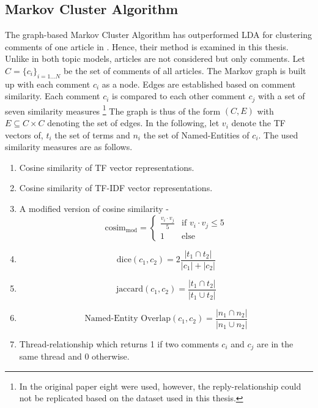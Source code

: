 \subsection{Markov Cluster Algorithm}
The graph-based Markov Cluster Algorithm has outperformed LDA for clustering comments of one article in \cite{DBLP:conf/ecir/AkerKBPBHG16}. Hence, their method is examined in this thesis. Unlike in both topic models, articles are not considered but only comments. Let $C = \{c_i\}_{i=1...N}$ be the set of comments of all articles. The Markov graph is built up with each comment $c_i$ as a node. Edges are established based on comment similarity. Each comment $c_i$ is compared to each other comment $c_j$ with a set of seven similarity measures \footnote{In the original paper \cite{DBLP:conf/ecir/AkerKBPBHG16} eight were used, however, the reply-relationship could not be replicated based on the dataset used in this thesis.} The graph is thus of the form $(C,E)$ with $E \subseteq C \times C$ denoting the set of edges.
In the following, let $v_i$ denote the TF vectors of, $t_i$ the set of terms and $n_i$ the set of Named-Entities of $c_i$. The used similarity measures are as follows.
\begin{enumerate}
\item Cosine similarity of TF vector representations.
\item Cosine similarity of TF-IDF vector representations.
\item A modified version of cosine similarity - \begin{equation}
\text{cosim}_{\text{mod}} = \begin{cases} 
      \frac{v_i \cdot v_j}{5} & \text{if } v_i \cdot v_j \leq 5\\
      1 & \text{else}
   \end{cases}
\end{equation}
\item \begin{equation}
\text{dice}(c_1,c_2) = 2\frac{|t_1 \cap t_2|}{|c_1|+|c_2|}
\end{equation}
\item \begin{equation}
\text{jaccard}(c_1,c_2) = \frac{|t_1 \cap t_2|}{|t_1 \cup t_2|}
\end{equation}
\item \begin{equation}
\text{Named-Entity Overlap}(c_1,c_2) = \frac{|n_1 \cap n_2|}{|n_1 \cup n_2|}
\end{equation}
\item Thread-relationship which returns 1 if two comments $c_i$ and $c_j$ are in the same thread and 0 otherwise.
\end{enumerate}
